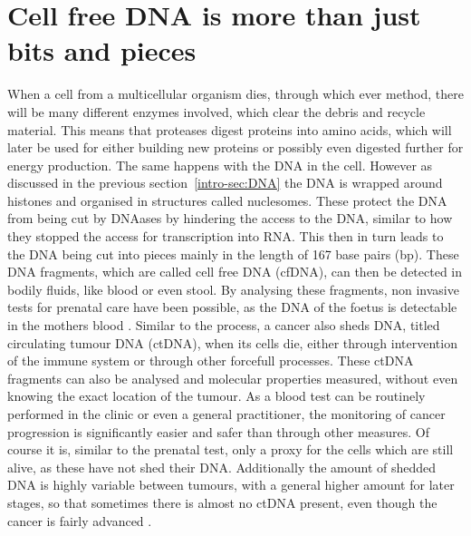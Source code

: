 \section[cfDNA]{Cell free DNA is more than just bits and pieces}
\label{intro-sec:ctDNA}

When a cell from a multicellular organism dies, through which ever method, there will be many different enzymes involved, which clear the debris and recycle material. This means that proteases digest proteins into amino acids, which will later be used for either building new proteins or possibly even digested further for energy production. The same happens with the DNA in the cell. However as discussed in the previous section~\ref{intro-sec:DNA} the DNA is wrapped around histones and organised in structures called nuclesomes. These protect the DNA from being cut by DNAases by hindering the access to the DNA, similar to how they stopped the access for transcription into RNA. This then in turn leads to the DNA being cut into pieces mainly in the length of 167 base pairs (bp). 
These DNA fragments, which are called cell free DNA (cfDNA), can then be detected in bodily fluids, like blood or even stool. By analysing these fragments, non invasive tests for prenatal care have been possible, as the DNA of the foetus is detectable in the mothers blood \cite{Dan2012,Nicolaides2013}.
Similar to the process, a cancer also sheds DNA, titled circulating tumour DNA (ctDNA), when its cells die, either through intervention of the immune system or through other forcefull processes. These ctDNA fragments can also be analysed and molecular properties measured, without even knowing the exact location of the tumour. As a blood test can be routinely performed in the clinic or even a general practitioner, the monitoring of cancer progression is significantly easier and safer than through other measures. Of course it is, similar to the prenatal test, only a proxy for the cells which are still alive, as these have not shed their DNA. Additionally the amount of shedded DNA is highly variable between tumours, with a general higher amount for later stages, so that sometimes there is almost no ctDNA present, even though the cancer is fairly advanced \cite{Diehl2008,Schwarzenbach2011}.

